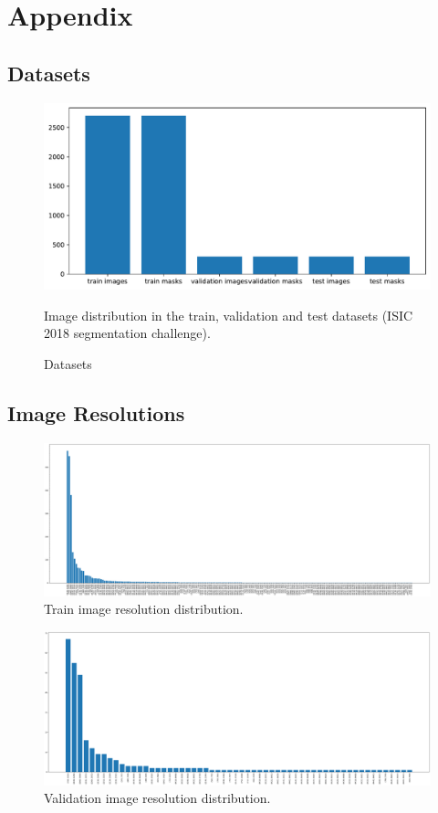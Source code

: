 \section{Appendix}
\label{sec:appendix}

\subsection{Datasets}

\begin{figure}[htb!]
  \centering
  \includegraphics[width=\textwidth]{assets/datasets.pdf}
  \caption{Datasets}
  {Image distribution in the train, validation and test datasets (ISIC 2018 segmentation challenge).}
  \label{datasets}
\end{figure}

\subsection{Image Resolutions}

\begin{figure}[htb!]
  \centering
  \includegraphics[width=\textwidth]{assets/train_image_resolutions.pdf}
  \caption{Train image resolution distribution.}
  \label{figure:1}
\end{figure}

\begin{figure}[htb!]
  \centering
  \includegraphics[width=\textwidth]{assets/valid_image_resolutions.pdf}
  \caption{Validation image resolution distribution.}
  \label{figure:2}
\end{figure}

